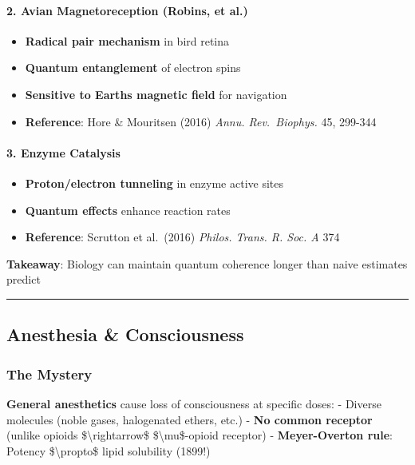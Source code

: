 \paragraph{2. Avian Magnetoreception (Robins, et
al.)}\label{avian-magnetoreception-robins-et-al.}

\begin{itemize}
\tightlist
\item
  \textbf{Radical pair mechanism} in bird retina
\item
  \textbf{Quantum entanglement} of electron spins
\item
  \textbf{Sensitive to Earth\textquotesingle s magnetic field} for
  navigation
\item
  \textbf{Reference}: Hore \& Mouritsen (2016) \emph{Annu.
  Rev.~Biophys.} 45, 299-344
\end{itemize}

\paragraph{3. Enzyme Catalysis}\label{enzyme-catalysis}

\begin{itemize}
\tightlist
\item
  \textbf{Proton/electron tunneling} in enzyme active sites
\item
  \textbf{Quantum effects} enhance reaction rates
\item
  \textbf{Reference}: Scrutton et al.~(2016) \emph{Philos. Trans. R.
  Soc. A} 374
\end{itemize}

\textbf{Takeaway}: Biology can maintain quantum coherence longer than
naive estimates predict

\begin{center}\rule{0.5\linewidth}{0.5pt}\end{center}

\subsection{Anesthesia \& Consciousness}\label{anesthesia-consciousness}

\subsubsection{The Mystery}\label{the-mystery}

\textbf{General anesthetics} cause loss of consciousness at specific
doses: - Diverse molecules (noble gases, halogenated ethers, etc.) -
\textbf{No common receptor} (unlike opioids
\$\textbackslash rightarrow\$ \$\textbackslash mu\$-opioid receptor) -
\textbf{Meyer-Overton rule}: Potency \$\textbackslash propto\$ lipid
solubility (1899!)

